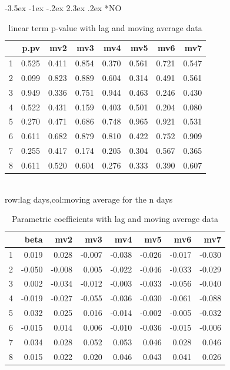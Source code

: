 \documentclass[a4paper, 12pt]{article}
\makeatletter
\def\large{\fontsize{14}{20}\selectfont}
\renewcommand\subsection{\@startsection {subsection}{1}{\z@}%
                                   {-3.5ex \@plus -1ex \@minus -.2ex}%
                                   {2.3ex \@plus.2ex}%
                                   {\centering\normalfont\large\bfseries}}
\makeatother
\begin{document}
\subsection*{NO}
\begin{table}[h]
\centering
\caption{linear term p-value with lag and moving average data}
\begin{tabular}{rrrrrrrr}
  \hline
 & p.pv & mv2 & mv3 & mv4 & mv5 & mv6 & mv7 \\
  \hline
1 & 0.525 & 0.411 & 0.854 & 0.370 & 0.561 & 0.721 & 0.547 \\
  2 & 0.099 & 0.823 & 0.889 & 0.604 & 0.314 & 0.491 & 0.561 \\
  3 & 0.949 & 0.336 & 0.751 & 0.944 & 0.463 & 0.246 & 0.430 \\
  4 & 0.522 & 0.431 & 0.159 & 0.403 & 0.501 & 0.204 & 0.080 \\
  5 & 0.270 & 0.471 & 0.686 & 0.748 & 0.965 & 0.921 & 0.531 \\
  6 & 0.611 & 0.682 & 0.879 & 0.810 & 0.422 & 0.752 & 0.909 \\
  7 & 0.255 & 0.417 & 0.174 & 0.205 & 0.304 & 0.567 & 0.365 \\
  8 & 0.611 & 0.520 & 0.604 & 0.276 & 0.333 & 0.390 & 0.607 \\
   \hline
\end{tabular}
\\row:lag days,col:moving average for the n days
\end{table}

\begin{table}[h]
\centering
\caption{Parametric coefficients with lag and moving average data}
\begin{tabular}{rrrrrrrr}
  \hline
 & beta & mv2 & mv3 & mv4 & mv5 & mv6 & mv7 \\
  \hline
1 & 0.019 & 0.028 & -0.007 & -0.038 & -0.026 & -0.017 & -0.030 \\
  2 & -0.050 & -0.008 & 0.005 & -0.022 & -0.046 & -0.033 & -0.029 \\
  3 & 0.002 & -0.034 & -0.012 & -0.003 & -0.033 & -0.056 & -0.040 \\
  4 & -0.019 & -0.027 & -0.055 & -0.036 & -0.030 & -0.061 & -0.088 \\
  5 & 0.032 & 0.025 & 0.016 & -0.014 & -0.002 & -0.005 & -0.032 \\
  6 & -0.015 & 0.014 & 0.006 & -0.010 & -0.036 & -0.015 & -0.006 \\
  7 & 0.034 & 0.028 & 0.052 & 0.053 & 0.046 & 0.028 & 0.046 \\
  8 & 0.015 & 0.022 & 0.020 & 0.046 & 0.043 & 0.041 & 0.026 \\
   \hline
\end{tabular}
\end{table}
\clearpage
\end{document}
